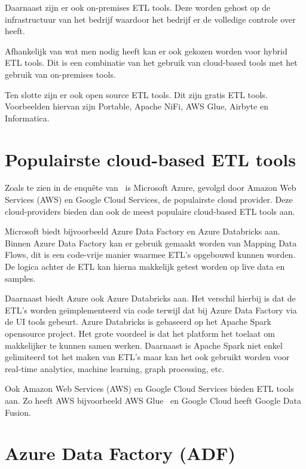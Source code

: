 Daarnaast zijn er ook on-premises ETL tools. Deze worden gehost op de infrastructuur van het bedrijf waardoor het bedrijf er de volledige controle over heeft.~\autocite{Ethan2024}

Afhankelijk van wat men nodig heeft kan er ook gekozen worden voor hybrid ETL tools. Dit is een combinatie van het gebruik van cloud-based tools met het gebruik van on-premises tools.~\autocite{Ethan2024}

Ten slotte zijn er ook open source ETL tools. Dit zijn gratis ETL tools. Voorbeelden hiervan zijn Portable, Apache NiFi, AWS Glue, Airbyte en Informatica.~\autocite{Ethan2024}

\section{Populairste cloud-based ETL tools}

Zoals te zien in de enquête van~\textcite{vines2023overview} is Microsoft Azure, gevolgd door Amazon Web Services (AWS) en Google Cloud Services, de populairste cloud provider. Deze cloud-providers bieden dan ook de meest populaire cloud-based ETL tools aan. 

Microsoft biedt bijvoorbeeld Azure Data Factory en Azure Databricks aan. Binnen Azure Data Factory kan er gebruik gemaakt worden van Mapping Data Flows, dit is een code-vrije manier waarmee ETL's opgebouwd kunnen worden. De logica achter de ETL kan hierna makkelijk getest worden op live data en samples.~\autocite{Kromer2022}

Daarnaast biedt Azure ook Azure Databricks aan. Het verschil hierbij is dat de ETL’s worden geïmplementeerd via code terwijl dat bij Azure Data Factory via de UI tools gebeurt. Azure Databricks is gebaseerd op het Apache Spark opensource project. Het grote voordeel is dat het platform het toelaat om makkelijker te kunnen samen werken. Daarnaast is Apache Spark niet enkel gelimiteerd tot het maken van ETL’s maar kan het ook gebruikt worden voor real-time analytics, machine learning, graph processing, etc.~\autocite{Etaati2019}

Ook Amazon Web Services (AWS) en Google Cloud Services bieden ETL tools aan. Zo heeft AWS bijvoorbeeld AWS Glue~\autocite{Khan2024} en Google Cloud heeft Google Data Fusion.~\autocite{Jaiswal2022}

\section{Azure Data Factory (ADF)}

